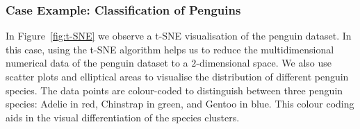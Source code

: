 \documentclass{article}\usepackage[]{graphicx}\usepackage[]{xcolor}
\numberwithin{equation}{section}
\begin{document}
\subsubsection{Case Example: Classification of Penguins}

In Figure~\ref{fig:t-SNE} we observe a t-SNE visualisation of the penguin dataset. In this case, using the t-SNE algorithm helps us to reduce the multidimensional numerical data of the penguin dataset to a $2$-dimensional space. We also use scatter plots and elliptical areas to visualise the distribution of different penguin species. The data points are colour-coded to distinguish between three penguin species: Adelie in red, Chinstrap in green, and Gentoo in blue. This colour coding aids in the visual differentiation of the species clusters.\\
\end{document}
